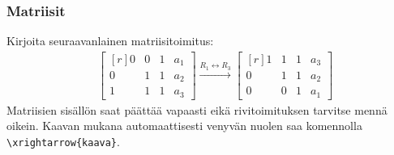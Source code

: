 \begin{fframe}
    \frametitle{Matriisit}
    \begin{harj}
        Kirjoita seuraavanlainen matriisitoimitus: 
        \begin{align*}
            &
            \begin{bmatrix*}[r]
                0 & 0 & 1 & a_1\\
                0 & 1 & 1 & a_2\\
                1 & 1 & 1 & a_3
            \end{bmatrix*}
        \xrightarrow{R_1\leftrightarrow R_3}
            \begin{bmatrix*}[r]
                1 & 1 & 1 & a_3\\
                0 & 1 & 1 & a_2\\
                0 & 0 & 1 & a_1
            \end{bmatrix*}
        \end{align*}
        Matriisien sisällön saat päättää vapaasti eikä rivitoimituksen tarvitse mennä oikein. %
        Kaavan mukana automaattisesti venyvän nuolen saa komennolla \lstinline-\xrightarrow{kaava}-.

    \end{harj}
\end{fframe}

